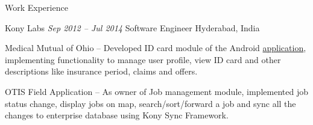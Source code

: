 \documentclass{resume} %
\begin{document}
\begin{rSection}{Work Experience}

\begin{rSubsection}{Kony Labs} {\emph{Sep 2012 -- Jul 2014}} {Software Engineer}
{Hyderabad, India}
\item Medical Mutual of Ohio -- Developed ID card module of the Android \href{https://play.google.com/store/apps/details?id=com.medmutual.mhp&hl=en} {application}, implementing functionality to manage user profile, view ID card and other descriptions like insurance period, claims and offers.
\item OTIS Field Application -- As owner of Job management module, implemented job status change, display jobs on map, search/sort/forward a job and sync all the changes to enterprise database using Kony Sync Framework.

\end{rSubsection}


\end{rSection}
\end{document}
